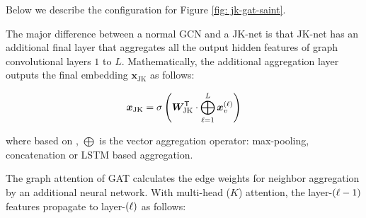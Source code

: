 \begin{table}
\caption{Training configuration of {\graphsaint} for Table \ref{tab: compare clustergcn}}
    \centering
    \label{tab: config cluster compare}
\end{table}




Below we describe the configuration for Figure \ref{fig: jk-gat-saint}. 

The major difference between a normal GCN and a JK-net \citep{jk-net} is that JK-net has an additional final layer that aggregates all the output hidden features of graph convolutional layers $1$ to $L$. 
Mathematically, the additional aggregation layer outputs the final embedding $\bm{x}_\text{JK}$ as follows:

\begin{equation}
    \bm{x}_\text{JK} = \sigma\left( \bm{W}_\text{JK}^{\mathsf{T}}\cdot \bigoplus\limits_{\ell=1}^L\bm{x}_v^{\left( \ell \right)} \right)
\end{equation}

where based on \cite{jk-net}, $\bigoplus$ is the vector aggregation operator: max-pooling, concatenation or LSTM \citep{lstm} based aggregation.

The graph attention of GAT \citep{gat} calculates the edge weights for neighbor aggregation by an additional neural network. With multi-head ($K$) attention, the layer-$\left( \ell-1 \right)$ features propagate to layer-$\left( \ell \right)$ as follows:

